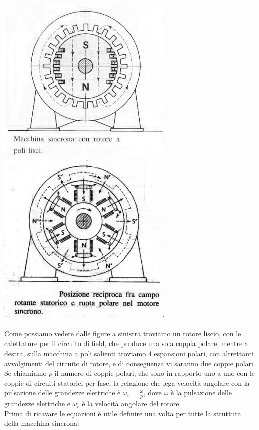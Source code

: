 \documentclass[Lau,noexaminfo]{sapthesis}
\begin{document}
	\includegraphics[height=0.25\textheight]{poli_lisci}
	\includegraphics[height=0.25\textheight]{poli_salienti}.\\\\
	Come possiamo vedere dalle figure a sinistra troviamo un rotore liscio, con le calettature per il circuito di field, che produce una sola coppia polare, mentre a destra, sulla macchina a poli salienti troviamo 4 espansioni polari, con altrettanti avvolgimenti del circuito di rotore, e di conseguenza vi saranno due coppie polari. Se chiamiamo $p$ il numero di coppie polari, che sono in rapporto uno a uno con le coppie di circuiti statorici per fase, la relazione che lega velocità angolare con la pulsazione delle grandezze elettriche è $\omega_r = \frac{\omega}{p}$, dove $\omega$ è la pulsazione delle grandezze elettriche e $\omega_r$ è la velocità angolare del rotore.\\
	Prima di ricavare le equazioni è utile definire una volta per tutte la struttura della macchina sincrona:\\
\end{document}
